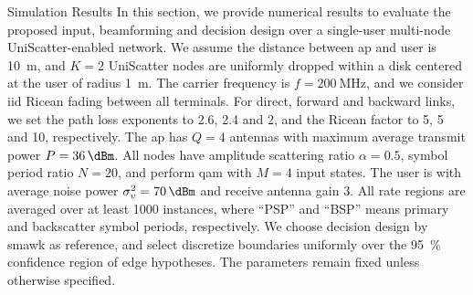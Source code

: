 \documentclass[journal]{IEEEtran}
\begin{document}
\begin{section}{Simulation Results}
	In this section, we provide numerical results to evaluate the proposed input, beamforming and decision design over a single-user multi-node UniScatter-enabled network.
	We assume the distance between \gls{ap} and user is \qty{10}{\meter}, and $K=2$ UniScatter nodes are uniformly dropped within a disk centered at the user of radius \qty{1}{\meter}.
	The carrier frequency is $f=\qty{200}{\MHz}$, and we consider \gls{iid} Ricean fading between all terminals.
	For direct, forward and backward links, we set the path loss exponents to \num{2.6}, \num{2.4} and \num{2}, and the Ricean factor to \num{5}, \num{5} and \num{10}, respectively.
	The \gls{ap} has $Q=4$ antennas with maximum average transmit power $P=\qty{36}{\dBm}$.
	All nodes have amplitude scattering ratio $\alpha=0.5$, symbol period ratio $N=20$, and perform \gls{qam} with $M=4$ input states.
	The user is with average noise power $\sigma_v^2=\qty{70}{\dBm}$ and receive antenna gain \qty{3}{\dBi}.
	All rate regions are averaged over at least \num{1000} instances, where ``PSP'' and ``BSP'' means primary and backscatter symbol periods, respectively.
	We choose decision design by \gls{smawk} \cite{He2021} as reference, and select discretize boundaries uniformly over the \qty{95}{\percent} confidence region of edge hypotheses.
	The parameters remain fixed unless otherwise specified.


\end{section}
\end{document}
